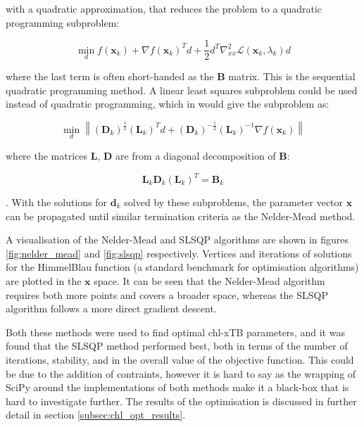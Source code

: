 with a quadratic approximation, that reduces the problem to a quadratic programming
subproblem:

\begin{equation}
\min_d f\left(\mathbf{x}_k\right) + \nabla f\left(\mathbf{x}_k\right)^T d + \frac{1}{2}d^T \nabla^2_{xx} \mathcal{L} \left(\mathbf{x}_k, \lambda_k \right) d
\end{equation}

where the last term is often short-handed as the $\mathbf{B}$ matrix. This is the 
sequential quadratic programming method. A linear least squares subproblem could
be used instead of quadratic programming, which in would give the subproblem as:

\begin{equation}
\min_d \left\| \left(\mathbf{D}_k\right)^{\frac{1}{2}} \left(\mathbf{L}_k\right)^T d + \left(\mathbf{D}_k\right)^{-\frac{1}{2}}\left(\mathbf{L}_k\right)^{-1}\nabla f \left(\mathbf{x}_k\right)\right\|
\end{equation}

where the matrices $\mathbf{L}$, $\mathbf{D}$ are from a diagonal decomposition 
of $\mathbf{B}$:

\begin{equation}
\mathbf{L}_k \mathbf{D}_k \left(\mathbf{L}_k\right)^T = \mathbf{B}_k
\end{equation}

. With the solutions for $\mathbf{d}_k$ solved by these subproblems, the parameter vector
$\mathbf{x}$ can be propagated until similar termination criteria as the Nelder-Mead
method.

A visualisation of the Nelder-Mead and SLSQP algorithms are shown in figures \ref{fig:nelder_mead}
and \ref{fig:slsqp} respectively. Vertices and iterations of solutions for the 
HimmelBlau function (a standard benchmark for optimisation algorithms) are plotted
in the $\mathbf{x}$ space. It can be seen that the Nelder-Mead algorithm requires
both more points and covers a broader space, whereas the SLSQP algorithm follows
a more direct gradient descent. 

Both these methods were used to find optimal chl-xTB parameters, and it was found 
that the SLSQP method performed best, both in terms of the number of iterations,
stability, and in the overall value of the objective function. This could be due 
to the addition of contraints, however it is hard to say as the wrapping of SciPy
around the implementations of both methods make it a black-box that is hard to 
investigate further. The results of the optimisation is discussed in further detail
in section \ref{subsec:chl_opt_results}.

